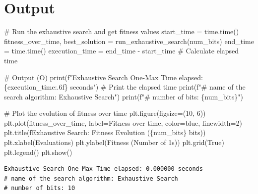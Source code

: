 \documentclass[
  letterpaper,
  DIV=11,
  numbers=noendperiod]{scrreprt}
\newenvironment{Shaded}{\begin{snugshade}}{\end{snugshade}}
\newcommand{\BuiltInTok}[1]{\textcolor[rgb]{0.00,0.23,0.31}{#1}}
\newcommand{\CommentTok}[1]{\textcolor[rgb]{0.37,0.37,0.37}{#1}}
\newcommand{\DecValTok}[1]{\textcolor[rgb]{0.68,0.00,0.00}{#1}}
\newcommand{\NormalTok}[1]{\textcolor[rgb]{0.00,0.23,0.31}{#1}}
\newcommand{\OperatorTok}[1]{\textcolor[rgb]{0.37,0.37,0.37}{#1}}
\newcommand{\SpecialCharTok}[1]{\textcolor[rgb]{0.37,0.37,0.37}{#1}}
\newcommand{\SpecialStringTok}[1]{\textcolor[rgb]{0.13,0.47,0.30}{#1}}
\newcommand{\StringTok}[1]{\textcolor[rgb]{0.13,0.47,0.30}{#1}}
\newcommand{\VariableTok}[1]{\textcolor[rgb]{0.07,0.07,0.07}{#1}}
\begin{document}
\section{Output}\label{output}

\begin{Shaded}
\begin{Highlighting}[]
\CommentTok{\# Run the exhaustive search and get fitness values}
\NormalTok{start\_time }\OperatorTok{=}\NormalTok{ time.time()}
\NormalTok{fitness\_over\_time, best\_solution }\OperatorTok{=}\NormalTok{ run\_exhaustive\_search(num\_bits)}
\NormalTok{end\_time }\OperatorTok{=}\NormalTok{ time.time()}
\NormalTok{execution\_time }\OperatorTok{=}\NormalTok{ end\_time }\OperatorTok{{-}}\NormalTok{ start\_time  }\CommentTok{\# Calculate elapsed time}

\CommentTok{\# Output (O)}
\BuiltInTok{print}\NormalTok{(}\SpecialStringTok{f"Exhaustive Search One{-}Max Time elapsed: }\SpecialCharTok{\{}\NormalTok{execution\_time}\SpecialCharTok{:.6f\}}\SpecialStringTok{ seconds"}\NormalTok{)  }\CommentTok{\# Print the elapsed time}
\BuiltInTok{print}\NormalTok{(}\SpecialStringTok{f"\# name of the search algorithm: Exhaustive Search"}\NormalTok{)}
\BuiltInTok{print}\NormalTok{(}\SpecialStringTok{f"\# number of bits: }\SpecialCharTok{\{}\NormalTok{num\_bits}\SpecialCharTok{\}}\SpecialStringTok{"}\NormalTok{)}

\CommentTok{\# Plot the evolution of fitness over time}
\NormalTok{plt.figure(figsize}\OperatorTok{=}\NormalTok{(}\DecValTok{10}\NormalTok{, }\DecValTok{6}\NormalTok{))}
\NormalTok{plt.plot(fitness\_over\_time, label}\OperatorTok{=}\StringTok{\textquotesingle{}Fitness over time\textquotesingle{}}\NormalTok{, color}\OperatorTok{=}\StringTok{\textquotesingle{}blue\textquotesingle{}}\NormalTok{, linewidth}\OperatorTok{=}\DecValTok{2}\NormalTok{)}
\NormalTok{plt.title(}\SpecialStringTok{f\textquotesingle{}Exhaustive Search: Fitness Evolution (}\SpecialCharTok{\{}\NormalTok{num\_bits}\SpecialCharTok{\}}\SpecialStringTok{ bits)\textquotesingle{}}\NormalTok{)}
\NormalTok{plt.xlabel(}\StringTok{\textquotesingle{}Evaluations\textquotesingle{}}\NormalTok{)}
\NormalTok{plt.ylabel(}\StringTok{\textquotesingle{}Fitness (Number of 1s)\textquotesingle{}}\NormalTok{)}
\NormalTok{plt.grid(}\VariableTok{True}\NormalTok{)}
\NormalTok{plt.legend()}
\NormalTok{plt.show()}
\end{Highlighting}
\end{Shaded}

\begin{verbatim}
Exhaustive Search One-Max Time elapsed: 0.000000 seconds
# name of the search algorithm: Exhaustive Search
# number of bits: 10
\end{verbatim}
\end{document}
